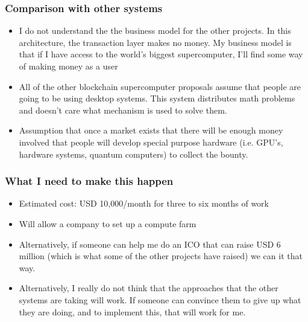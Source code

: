 \documentclass{beamer}
\begin{document}
\begin{frame}
    \frametitle{Comparison with other systems}
    \begin{itemize}
    \item I do not understand the the business model for the other
      projects.  In this architecture, the transaction layer makes no
      money.  My business model is that if I have access to the
      world's biggest supercomputer, I'll find some way of making
      money as a user
    \item All of the other blockchain supercomputer proposals assume
      that people are going to be using desktop systems.  This system
      distributes math problems and doesn't care what mechanism is
      used to solve them.
    \item Assumption that once a market exists that there will be
      enough money involved that people will develop special purpose
      hardware (i.e. GPU's, hardware systems, quantum computers) to
      collect the bounty.  
    \end{itemize}
\end{frame}
\begin{frame}
  \frametitle{What I need to make this happen}
  \begin{itemize}
  \item Estimated cost: USD 10,000/month for three to six months of work
  \item Will allow a company to set up a compute farm
  \item Alternatively, if someone can help me do an ICO that can
    raise USD 6 million (which is what some of the other projects
    have raised) we can it that way.
  \item Alternatively, I really do not think that the approaches that
    the other systems are taking will work.  If someone can convince
    them to give up what they are doing, and to implement this, that
    will work for me.
  \end{itemize}
\end{frame}
\end{document}
